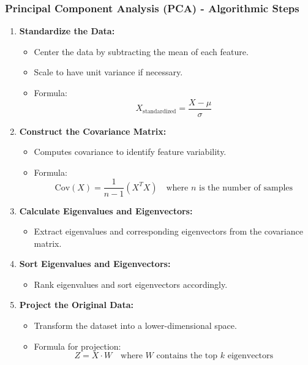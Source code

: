 \documentclass[aspectratio=169]{beamer}
\begin{document}
\begin{frame}[fragile]
    \frametitle{Principal Component Analysis (PCA) - Algorithmic Steps}
    \begin{enumerate}
        \item \textbf{Standardize the Data:}
        \begin{itemize}
            \item Center the data by subtracting the mean of each feature.
            \item Scale to have unit variance if necessary.
            \item Formula: 
            \begin{equation}
                X_{\text{standardized}} = \frac{X - \mu}{\sigma}
            \end{equation}
        \end{itemize}

        \item \textbf{Construct the Covariance Matrix:}
        \begin{itemize}
            \item Computes covariance to identify feature variability.
            \item Formula:
            \begin{equation}
                \text{Cov}(X) = \frac{1}{n-1}(X^TX) \quad \text{where } n \text{ is the number of samples}
            \end{equation}
        \end{itemize}

        \item \textbf{Calculate Eigenvalues and Eigenvectors:}
        \begin{itemize}
            \item Extract eigenvalues and corresponding eigenvectors from the covariance matrix.
        \end{itemize}

        \item \textbf{Sort Eigenvalues and Eigenvectors:}
        \begin{itemize}
            \item Rank eigenvalues and sort eigenvectors accordingly.
        \end{itemize}

        \item \textbf{Project the Original Data:}
        \begin{itemize}
            \item Transform the dataset into a lower-dimensional space.
            \item Formula for projection:
            \begin{equation}
                Z = X \cdot W \quad \text{where } W \text{ contains the top } k \text{ eigenvectors}
            \end{equation}
        \end{itemize}
    \end{enumerate}
\end{frame}
\end{document}
